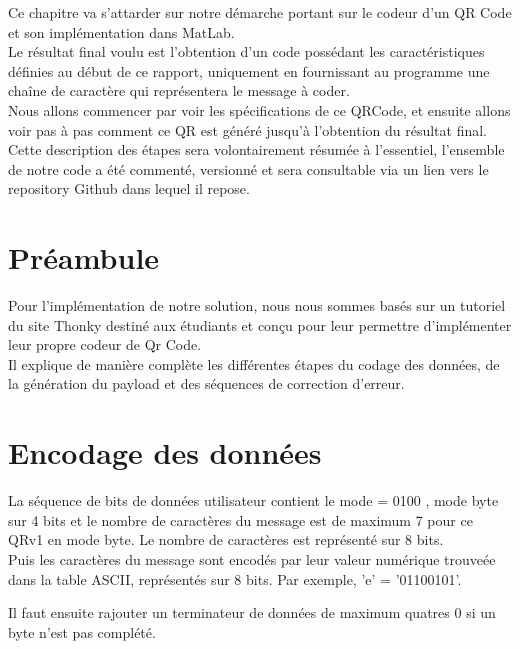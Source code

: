 \documentclass{report}
\begin{document}
	Ce chapitre va s'attarder sur notre démarche portant sur le codeur d'un QR Code et son implémentation dans MatLab.\\
	Le résultat final voulu est l'obtention d'un code possédant les caractéristiques définies au début de ce rapport, uniquement en fournissant au programme une chaîne de caractère qui représentera le message à coder.\\

	Nous allons commencer par voir les spécifications de ce QRCode, et ensuite allons voir pas à pas comment ce QR est généré jusqu'à l'obtention du résultat final.\\

	Cette description des étapes sera volontairement résumée à l'essentiel, l'ensemble de notre code a été commenté, versionné et sera consultable via un lien vers le repository Github dans lequel il repose.\\

	\section{Préambule}

		Pour l'implémentation de notre solution, nous nous sommes basés sur un tutoriel du site Thonky destiné aux étudiants et conçu pour leur permettre d'implémenter leur propre codeur de Qr Code.\\
		Il explique de manière complète les différentes étapes du codage des données, de la génération du payload et des séquences de correction d'erreur.\\

	\section{Encodage des données}

		La séquence de bits de données utilisateur contient le mode = 0100 , mode byte sur 4 bits et le nombre de caractères du message est de maximum 7 pour ce QRv1 en mode byte. Le nombre de caractères est représenté sur 8 bits.\\

        Puis les caractères du message sont encodés par leur valeur numérique trouveée dans la table ASCII, représentés sur 8 bits. Par exemple, 'e' = '01100101'.

		Il faut ensuite rajouter un terminateur de données de maximum quatres 0 si un byte n'est pas complété.\\
\end{document}

